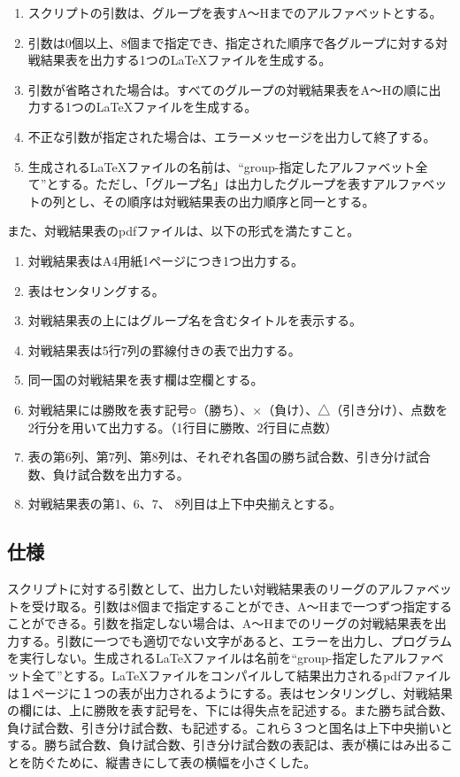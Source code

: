 \documentclass{procreport}
\begin{document}
\begin{enumerate}
\item スクリプトの引数は、グループを表すA～Hまでのアルファベットとする。
\item 引数は0個以上、8個まで指定でき、指定された順序で各グループに対する対戦結果表を出力する1つのLaTeXファイルを生成する。
\item 引数が省略された場合は。すべてのグループの対戦結果表をA～Hの順に出力する1つのLaTeXファイルを生成する。
\item 不正な引数が指定された場合は、エラーメッセージを出力して終了する。
\item 生成されるLaTeXファイルの名前は、``group-指定したアルファベット全て''とする。ただし、「グループ名」は出力したグループを表すアルファベットの列とし、その順序は対戦結果表の出力順序と同一とする。 
\end{enumerate}

また、対戦結果表のpdfファイルは、以下の形式を満たすこと。

\begin{enumerate}
\item 対戦結果表はA4用紙1ページにつき1つ出力する。
\item 表はセンタリングする。
\item 対戦結果表の上にはグループ名を含むタイトルを表示する。
\item 対戦結果表は5行7列の罫線付きの表で出力する。
\item 同一国の対戦結果を表す欄は空欄とする。
\item 対戦結果には勝敗を表す記号○（勝ち）、×（負け）、△（引き分け）、点数を2行分を用いて出力する。（1行目に勝敗、2行目に点数）
\item 表の第6列、第7列、第8列は、それぞれ各国の勝ち試合数、引き分け試合数、負け試合数を出力する。
\item 対戦結果表の第1、6、7、 8列目は上下中央揃えとする。 
\end{enumerate}

\subsection{仕様}
\label{sec:charactor}
スクリプトに対する引数として、出力したい対戦結果表のリーグのアルファベットを受け取る。引数は8個まで指定することができ、A～Hまで一つずつ指定することができる。引数を指定しない場合は、A～Hまでのリーグの対戦結果表を出力する。引数に一つでも適切でない文字があると、エラーを出力し、プログラムを実行しない。生成されるLaTeXファイルは名前を``group-指定したアルファベット全て''とする。LaTeXファイルをコンパイルして結果出力されるpdfファイルは１ページに１つの表が出力されるようにする。表はセンタリングし、対戦結果の欄には、上に勝敗を表す記号を、下には得失点を記述する。また勝ち試合数、負け試合数、引き分け試合数、も記述する。これら３つと国名は上下中央揃いとする。勝ち試合数、負け試合数、引き分け試合数の表記は、表が横にはみ出ることを防ぐために、縦書きにして表の横幅を小さくした。
\end{document}
